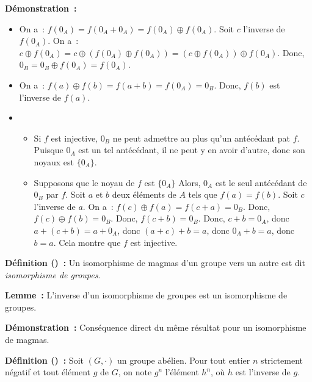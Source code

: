 \medskip

\noindent\textbf{Démonstration :}
    \begin{itemize}[nosep]
        \item On a : $f(0_A) = f(0_A + 0_A) = f(0_A) \oplus f(0_A)$. 
            Soit $c$ l'inverse de $f(0_A)$.
            On a : $c \oplus f(0_A) = c \oplus (f(0_A) \oplus f(0_A)) = (c \oplus f(0_A)) \oplus f(0_A)$.
            Donc, $0_B = 0_B \oplus f(0_A) = f(0_A)$.
        \item On a : $f(a) \oplus f(b) = f(a + b) = f(0_A) = 0_B$.
            Donc, $f(b)$ est l'inverse de $f(a)$.
        \item 
            \begin{itemize}[nosep]
                \item Si $f$ est injective, $0_B$ ne peut admettre au plus qu'un antécédant pat $f$. 
                    Puisque $0_A$ est un tel antécédant, il ne peut y en avoir d'autre, donc son noyaux est $\lbrace 0_A \rbrace$.
                \item Supposons que le noyau de $f$ est $\lbrace 0_A \rbrace$
                    Alors, $0_A$ est le seul antécédant de $0_B$ par $f$.
                    Soit $a$ et $b$ deux éléments de $A$ tels que $f(a) = f(b)$. 
                    Soit $c$ l'inverse de $a$.
                    On a : $f(c) \oplus f(a) = f(c + a) = 0_B$.
                    Donc, $f(c) \oplus f(b) = 0_B$.
                    Donc, $f(c + b) = 0_B$.
                    Donc, $c + b = 0_A$, donc $a + (c + b) = a + 0_A$, donc $(a + c) + b = a$, donc $0_A + b = a$, donc $b = a$.
                    Cela montre que $f$ est injective.
            \end{itemize}
    \end{itemize}

    \done

\medskip

\noindent\textbf{Définition () :} Un isomorphisme de magmas d'un groupe vers un autre est dit \textit{isomorphisme de groupes}.

\medskip

\noindent\textbf{Lemme :} L'inverse d'un isomorphisme de groupes est un isomorphisme de groupes.

\medskip

\noindent\textbf{Démonstration :} Conséquence direct du même résultat pour un isomorphisme de magmas.

\medskip

\noindent\textbf{Définition () :} Soit $(G,\cdot)$ un groupe abélien. 
    Pour tout entier $n$ strictement négatif et tout élément $g$ de $G$, on note $g^n$ l'élément $h^n$, où $h$ est l'inverse de $g$.

